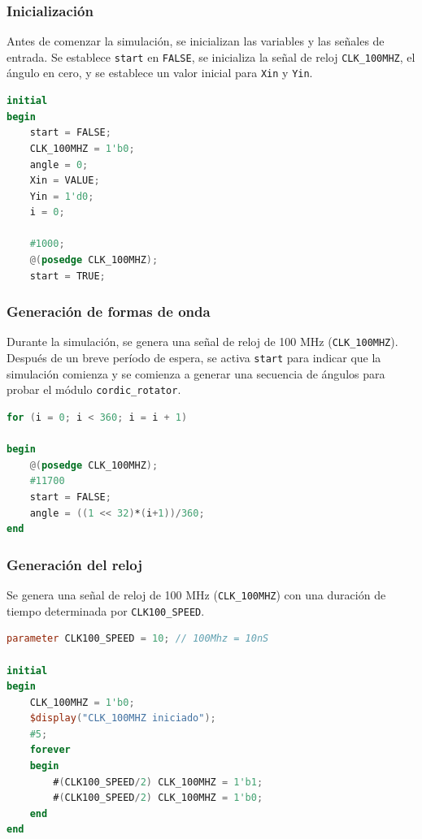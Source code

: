 \documentclass[12pt,a4paper, twoside]{article} %
\begin{document}
\subsubsection{Inicialización}
Antes de comenzar la simulación, se inicializan las variables y las señales de entrada. Se establece \texttt{start} en \texttt{FALSE}, se inicializa la señal de reloj \texttt{CLK\_100MHZ}, el ángulo en cero, y se establece un valor inicial para \texttt{Xin} y \texttt{Yin}.

\begin{lstlisting}[language=Verilog]
initial
begin
    start = FALSE;
    CLK_100MHZ = 1'b0;
    angle = 0;
    Xin = VALUE;
    Yin = 1'd0;
    i = 0;
  
    #1000;
    @(posedge CLK_100MHZ);
    start = TRUE;
\end{lstlisting}

\subsubsection{Generación de formas de onda}
Durante la simulación, se genera una señal de reloj de 100 MHz (\texttt{CLK\_100MHZ}). Después de un breve período de espera, se activa \texttt{start} para indicar que la simulación comienza y se comienza a generar una secuencia de ángulos para probar el módulo \texttt{cordic\_rotator}.

\begin{lstlisting}[language=Verilog]
for (i = 0; i < 360; i = i + 1)  

begin
    @(posedge CLK_100MHZ);
    #11700
    start = FALSE;
    angle = ((1 << 32)*(i+1))/360;
end
\end{lstlisting}

\subsubsection{Generación del reloj}
Se genera una señal de reloj de 100 MHz (\texttt{CLK\_100MHZ}) con una duración de tiempo determinada por \texttt{CLK100\_SPEED}.

\begin{lstlisting}[language=Verilog]
parameter CLK100_SPEED = 10; // 100Mhz = 10nS

initial
begin
    CLK_100MHZ = 1'b0;
    $display("CLK_100MHZ iniciado");
    #5;
    forever
    begin
        #(CLK100_SPEED/2) CLK_100MHZ = 1'b1;
        #(CLK100_SPEED/2) CLK_100MHZ = 1'b0;
    end
end
\end{lstlisting}
\end{document}
